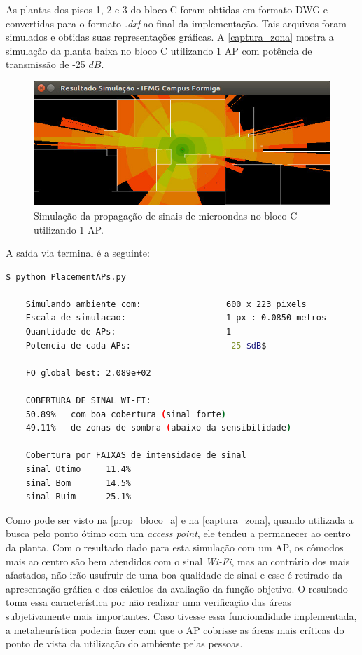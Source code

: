 \documentclass[
	12pt,				%
	twoside,			%
	a4paper,			%
	english,			%
	french,				%
	spanish,			%
	brazil				%
	]{abntex2}
\begin{document}
As plantas dos pisos 1, 2 e 3 do bloco C foram obtidas em formato DWG e
convertidas para o formato \emph{.dxf} ao final da implementação. Tais
arquivos foram simulados e obtidas suas representações gráficas. A
\autoref{captura_zona} mostra a simulação da planta baixa no bloco C
utilizando 1 AP com potência de transmissão de -25 \(dB\).

\begin{figure}[ht]
    \caption{\label{captura_zona} Simulação da propagação de sinais de microondas no bloco C utilizando 1 AP.
        }
    \begin{center}
        \includegraphics[scale=0.7]{imagens/captura-zona-2.jpg}
    \end{center}
\end{figure}

A saída via terminal é a seguinte:

\begin{lstlisting}[language=bash]
    $ python PlacementAPs.py 
    
    Simulando ambiente com:                 600 x 223 pixels
    Escala de simulacao:                    1 px : 0.0850 metros
    Quantidade de APs:                      1
    Potencia de cada APs:                   -25 $dB$
    
    FO global best: 2.089e+02
    
    COBERTURA DE SINAL WI-FI:
    50.89%   com boa cobertura (sinal forte)
    49.11%   de zonas de sombra (abaixo da sensibilidade)
    
    Cobertura por FAIXAS de intensidade de sinal
    sinal Otimo     11.4%
    sinal Bom       14.5%
    sinal Ruim      25.1%

\end{lstlisting}

Como pode ser visto na \autoref{prop_bloco_a} e na
\autoref{captura_zona}, quando utilizada a busca pelo ponto ótimo com um
\emph{access point}, ele tendeu a permanecer ao centro da planta. Com o
resultado dado para esta simulação com um AP, os cômodos mais ao centro
são bem atendidos com o sinal \emph{Wi-Fi}, mas ao contrário dos mais
afastados, não irão usufruir de uma boa qualidade de sinal e esse é
retirado da apresentação gráfica e dos cálculos da avaliação da função
objetivo. O resultado toma essa característica por não realizar uma
verificação das áreas subjetivamente mais importantes. Caso tivesse essa
funcionalidade implementada, a metaheurística poderia fazer com que o AP
cobrisse as áreas mais críticas do ponto de vista da utilização do
ambiente pelas pessoas.
\end{document}
